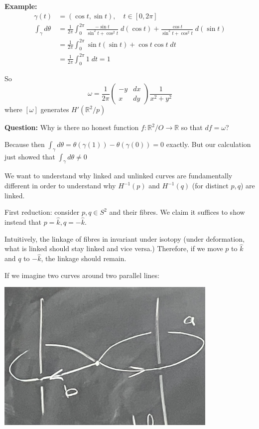 \documentclass[12pt]{article}
\renewcommand{\hat}[1]{\widehat{#1}}
\newcommand{\R}{\mathbb{R}}
\newcommand{\khat}{\hat{k}}
\begin{document}
    \textbf{Example:} 
    \begin{align*}
        \gamma(t) &= ( \cos t, \sin t), \quad t \in [0, 2\pi]\\ 
        \int_\gamma d\theta &= \frac{1}{2\pi}\int_0^{2\pi} \frac{-\sin t}{\sin^2 t + \cos^2 t} \; d(\cos t) + \frac{\cos t}{\sin^2 t + \cos^2 t} \; d(\sin t)\\
        &= \frac{1}{2\pi}\int_0^{2\pi} \sin t(\sin t) + \cos t \cos t \; dt\\ 
        &= \frac{1}{2\pi}\int_0^{2\pi} 1 \; dt = 1
    \end{align*}

    So 
    \[\omega = \frac{1}{2\pi}\begin{pmatrix}
        -y & dx\\ 
        x & dy
    \end{pmatrix} \frac{1}{x^2 + y^2}\]
    where $[\omega]$ generates $H'(\R^2/p)$

    \textbf{Question:} Why is there no honest function $f: \R^2/O \to \R$ so that $df = \omega$? 

    Because then $\int_{\gamma} d\theta = \theta(\gamma(1)) - \theta(\gamma(0)) = 0$ exactly. But our calculation just showed that $\int_{\gamma}d\theta \neq 0$ 

    We want to understand why linked and unlinked curves are fundamentally different in order to understand why $H^{-1}(p)$ and $H^{-1}(q)$ (for distinct $p, q$) are linked. 

    First reduction: consider $p, q \in S^2$ and their fibres. We claim it suffices to show instead that $p = \khat, q = -\khat$. 

    Intuitively, the linkage of fibres in invariant under isotopy (under deformation, what is linked should stay linked and vice versa.) Therefore, if we move $p$ to $\khat$ and $q$ to $-\khat$, the linkage should remain.

    If we imagine two curves around two parallel lines: 
    \begin{center}
        \includegraphics[width=0.8\textwidth]{Images/April 24 - Parallel lines.png}
    \end{center}
\end{document}
